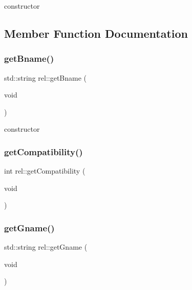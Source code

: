 constructor 

\subsection{Member Function Documentation}
\mbox{\label{classrel_a1bb74d090c50469946d0eb1ccd9ab520}} 
\subsubsection{\texorpdfstring{get\+Bname()}{getBname()}}
{\footnotesize\ttfamily std\+::string rel\+::get\+Bname (\begin{DoxyParamCaption}\item[{void}]{ }\end{DoxyParamCaption})}



constructor 

\mbox{\label{classrel_aebf12c2915c3231f23e4559b99c47a73}} 
\subsubsection{\texorpdfstring{get\+Compatibility()}{getCompatibility()}}
{\footnotesize\ttfamily int rel\+::get\+Compatibility (\begin{DoxyParamCaption}\item[{void}]{ }\end{DoxyParamCaption})}

\mbox{\label{classrel_a250562cd452083afa84a0d5e02d7c1a6}} 
\subsubsection{\texorpdfstring{get\+Gname()}{getGname()}}
{\footnotesize\ttfamily std\+::string rel\+::get\+Gname (\begin{DoxyParamCaption}\item[{void}]{ }\end{DoxyParamCaption})}

\mbox{\label{classrel_af5bb5fbc139defc9433ace4f829124b0}} 
